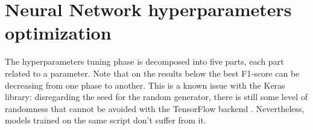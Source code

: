 \chapter{Neural Network hyperparameters optimization}
\label{annex:nn-fine-tuning}

The hyperparameters tuning phase is decomposed into five parts, each part related to a parameter. Note that on the results below the best F1-score can be decreasing from one phase to another. This is a known issue with the Keras library: disregarding the seed for the random generator, there is still some level of randomness that cannot be avoided with the TensorFlow backend \cite{keras:seed-issue-blog,keras:seed-issue-github}. Nevertheless, models trained on the same script don't suffer from it.


